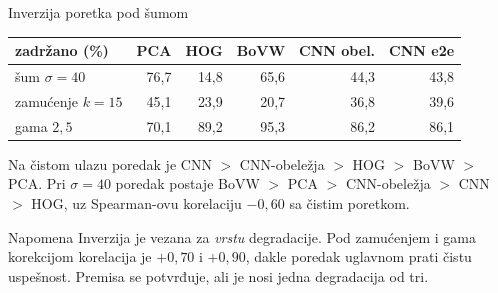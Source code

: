 \documentclass[aspectratio=169, 10pt]{beamer}
\newcommand{\uska}{\setlength{\tabcolsep}{4pt}\small}
\begin{document}
\begin{frame}{Inverzija poretka pod šumom}

\begin{center}
\uska
\begin{tabular}{lrrrrr}
\toprule
\textbf{zadržano (\%)} & \textbf{PCA} & \textbf{HOG} & \textbf{BoVW} & \textbf{CNN obel.} & \textbf{CNN e2e} \\
\midrule
šum $\sigma=40$        & \alert{76,7} & \alert{14,8} & 65,6 & 44,3 & 43,8 \\
zamućenje $k=15$       & \alert{45,1} & 23,9 & \alert{20,7} & 36,8 & 39,6 \\
gama $2{,}5$           & \alert{70,1} & 89,2 & \alert{95,3} & 86,2 & 86,1 \\
\bottomrule
\end{tabular}
\end{center}

\vspace{0.35cm}
Na čistom ulazu poredak je CNN $>$ CNN-obeležja $>$ HOG $>$ BoVW $>$ PCA.
Pri $\sigma=40$ poredak postaje BoVW $>$ PCA $>$ CNN-obeležja $>$ CNN $>$ HOG, uz
Spearman-ovu korelaciju \alert{$-0{,}60$} sa čistim poretkom.

\begin{alertblock}{Napomena}
Inverzija je vezana za \emph{vrstu} degradacije. Pod zamućenjem i gama korekcijom korelacija
je $+0{,}70$ i $+0{,}90$, dakle poredak uglavnom prati čistu uspešnost. Premisa se potvrđuje,
ali je nosi jedna degradacija od tri.
\end{alertblock}

\end{frame}
\end{document}
